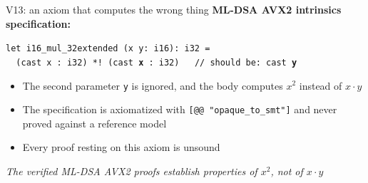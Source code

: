 \ifdefined\PRESENTATION\else\PassOptionsToClass{handout}{beamer}\fi\documentclass[aspectratio=169, lualatex]{beamer}
\begin{document}
\begin{frame}{V13: an axiom that computes the wrong thing}
	\textbf{ML-DSA AVX2 intrinsics specification:}
	\begin{flushleft}
		\texttt{let i16\_mul\_32extended (x y: i16): i32 =}\\
		\texttt{~~(cast x : i32) *! (cast \textbf{x} : i32) ~~// should be: cast \textbf{y}}
	\end{flushleft}
	\vspace{0.5em}
	\begin{itemize}
		\item The second parameter \texttt{y} is ignored, and the body computes $x^2$ instead of $x \cdot y$
		\item The specification is axiomatized with \texttt{[@@ "opaque\_to\_smt"]} and never proved against a reference model
		\item Every proof resting on this axiom is unsound
	\end{itemize}
	\vspace{0.5em}
	\begin{center}
		\textit{The verified ML-DSA AVX2 proofs establish properties of $x^2$, not of $x \cdot y$}
	\end{center}
\end{frame}
\end{document}
